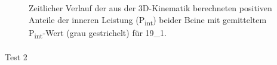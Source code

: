 \documentclass[
  letterpaper,
  DIV=11]{scrartcl}
\makeatletter
\let\oldparagraph\paragraph
\renewcommand{\paragraph}{
    \@ifstar
      \xxxParagraphStar
      \xxxParagraphNoStar
  }
\newcommand{\xxxParagraphStar}[1]{\oldparagraph*{#1}\mbox{}}
\newcommand{\xxxParagraphNoStar}[1]{\oldparagraph{#1}\mbox{}}
\makeatother
\begin{document}
\begin{figure}


\caption{\label{fig-PInt_Kinematik_19_1}Zeitlicher Verlauf der aus der
3D-Kinematik berechneten positiven Anteile der inneren Leistung
(P\textsubscript{int}) beider Beine mit gemitteltem
P\textsubscript{int}-Wert (grau gestrichelt) für 19\_1.}

\end{figure}%

\paragraph{Test 2}
\end{document}
